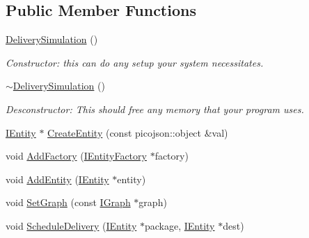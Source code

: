 \subsection*{Public Member Functions}
\begin{DoxyCompactItemize}
\item 
\mbox{\label{classcsci3081_1_1DeliverySimulation_ae59f8cb2306f603c4887fcaa06613200}} 
\hyperlink{classcsci3081_1_1DeliverySimulation_ae59f8cb2306f603c4887fcaa06613200}{Delivery\+Simulation} ()
\begin{DoxyCompactList}\small\item\em Constructor\+: this can do any setup your system necessitates. \end{DoxyCompactList}\item 
\mbox{\label{classcsci3081_1_1DeliverySimulation_a83a3c4b1ba37a675bae575d3f46c55ab}} 
\hyperlink{classcsci3081_1_1DeliverySimulation_a83a3c4b1ba37a675bae575d3f46c55ab}{$\sim$\+Delivery\+Simulation} ()
\begin{DoxyCompactList}\small\item\em Desconstructor\+: This should free any memory that your program uses. \end{DoxyCompactList}\item 
\hyperlink{classentity__project_1_1IEntity}{I\+Entity} $\ast$ \hyperlink{classcsci3081_1_1DeliverySimulation_a2441732ada38ae3b816266c9d471e528}{Create\+Entity} (const picojson\+::object \&val)
\item 
void \hyperlink{classcsci3081_1_1DeliverySimulation_a25b9f689b5ec1c831776d6160593e605}{Add\+Factory} (\hyperlink{classentity__project_1_1IEntityFactory}{I\+Entity\+Factory} $\ast$factory)
\item 
void \hyperlink{classcsci3081_1_1DeliverySimulation_ad8693e6b107599588c4f6f944911d0ed}{Add\+Entity} (\hyperlink{classentity__project_1_1IEntity}{I\+Entity} $\ast$entity)
\item 
void \hyperlink{classcsci3081_1_1DeliverySimulation_a11ca7b8572484e707b3cd8285e522e9c}{Set\+Graph} (const \hyperlink{classentity__project_1_1IGraph}{I\+Graph} $\ast$graph)
\item 
void \hyperlink{classcsci3081_1_1DeliverySimulation_a4d777e31fb067b5a5475c88116a321e1}{Schedule\+Delivery} (\hyperlink{classentity__project_1_1IEntity}{I\+Entity} $\ast$package, \hyperlink{classentity__project_1_1IEntity}{I\+Entity} $\ast$dest)

\end{DoxyCompactItemize}
